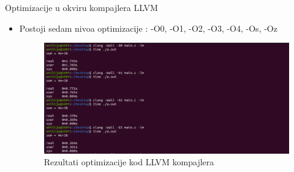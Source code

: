 \documentclass[compress, containsverbatim,mathserif, xcolor=dvipsnames, unicode]{beamer}
\begin{document}
\begin{frame}{Optimizacije u okviru kompajlera LLVM}
    \begin{itemize}
        \item Postoji sedam nivoa optimizacije : -O0, -O1, -O2, -O3, -O4, -Os, -Oz
        \begin{figure}[h!]
        \begin{center}
          \includegraphics[scale = 0.25]{../pics/test2.png}
        \end{center}
       \caption{Rezultati optimizacije kod LLVM kompajlera}
    \end{figure} 
    \end{itemize}    
\end{frame}
\end{document}
